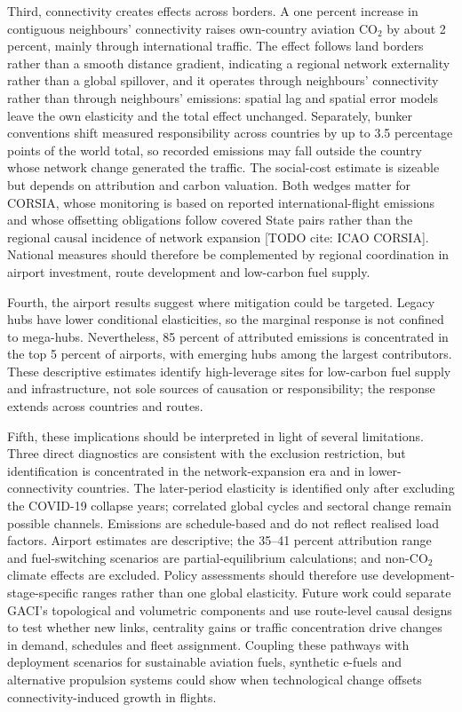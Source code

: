 \documentclass[12pt]{extarticle}
\begin{document}
Third, connectivity creates effects across borders. A one percent increase in contiguous neighbours' connectivity raises own-country aviation CO$_2$ by about 2 percent, mainly through international traffic. The effect follows land borders rather than a smooth distance gradient, indicating a regional network externality rather than a global spillover, and it operates through neighbours' connectivity rather than through neighbours' emissions: spatial lag and spatial error models leave the own elasticity and the total effect unchanged. Separately, bunker conventions shift measured responsibility across countries by up to 3.5 percentage points of the world total, so recorded emissions may fall outside the country whose network change generated the traffic. The social-cost estimate is sizeable but depends on attribution and carbon valuation. Both wedges matter for CORSIA, whose monitoring is based on reported international-flight emissions and whose offsetting obligations follow covered State pairs rather than the regional causal incidence of network expansion [TODO cite: ICAO CORSIA]. National measures should therefore be complemented by regional coordination in airport investment, route development and low-carbon fuel supply.

Fourth, the airport results suggest where mitigation could be targeted. Legacy hubs have lower conditional elasticities, so the marginal response is not confined to mega-hubs. Nevertheless, 85 percent of attributed emissions is concentrated in the top 5 percent of airports, with emerging hubs among the largest contributors. These descriptive estimates identify high-leverage sites for low-carbon fuel supply and infrastructure, not sole sources of causation or responsibility; the response extends across countries and routes.

Fifth, these implications should be interpreted in light of several limitations. Three direct diagnostics are consistent with the exclusion restriction, but identification is concentrated in the network-expansion era and in lower-connectivity countries. The later-period elasticity is identified only after excluding the COVID-19 collapse years; correlated global cycles and sectoral change remain possible channels. Emissions are schedule-based and do not reflect realised load factors. Airport estimates are descriptive; the 35--41 percent attribution range and fuel-switching scenarios are partial-equilibrium calculations; and non-CO$_2$ climate effects are excluded. Policy assessments should therefore use development-stage-specific ranges rather than one global elasticity. Future work could separate GACI's topological and volumetric components and use route-level causal designs to test whether new links, centrality gains or traffic concentration drive changes in demand, schedules and fleet assignment. Coupling these pathways with deployment scenarios for sustainable aviation fuels, synthetic e-fuels and alternative propulsion systems could show when technological change offsets connectivity-induced growth in flights.
\end{document}
